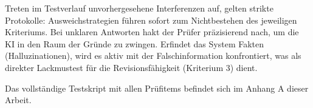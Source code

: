 Treten im Testverlauf unvorhergesehene Interferenzen auf, gelten strikte Protokolle: Ausweichstrategien führen sofort zum Nichtbestehen des jeweiligen Kriteriums. Bei unklaren Antworten hakt der Prüfer präzisierend nach, um die KI in den Raum der Gründe zu zwingen. Erfindet das System Fakten (Halluzinationen), wird es aktiv mit der Falschinformation konfrontiert, was als direkter Lackmustest für die Revisionsfähigkeit (Kriterium 3) dient. 

Das vollständige Testskript mit allen Prüfitems befindet sich im Anhang A dieser Arbeit.

